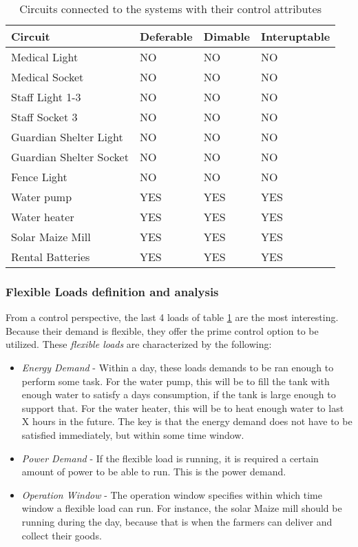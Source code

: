 \begin{table}[]
    \centering
    \small
    \begin{tabular}{|>{\raggedright\arraybackslash}p{4cm}|p{1.5cm}|p{1.5cm}|p{2cm}|}
         Circuit & Deferable & Dimable & Interuptable \\
         \hline
         Medical Light & NO & NO & NO\\
         Medical Socket & NO & NO & NO\\
         Staff Light 1-3 & NO & NO & NO\\
         Staff Socket 3 & NO & NO & NO\\
         Guardian Shelter Light & NO & NO & NO\\
         Guardian Shelter Socket & NO & NO & NO\\
         Fence Light & NO & NO & NO\\
         \hline
         Water pump & YES & YES & YES\\
         Water heater & YES & YES & YES\\
         \hline
         Solar Maize Mill & YES & YES & YES\\
         Rental Batteries & YES & YES & YES\\
         \hline
    \end{tabular}
    \caption[Circuits control attributes]{Circuits connected to the systems with their control attributes}
    \label{tab:circuit_control}
\end{table}

\subsubsection{Flexible Loads definition and analysis}\label{seq:flex_loads}
From a control perspective, the last 4 loads of table \ref{tab:circuit_control} are the most interesting. Because their demand is flexible, they offer the prime control option to be utilized. These \textit{flexible loads} are characterized by the following:
\begin{itemize}
    \item \textit{Energy Demand}    -   Within a day, these loads demands to be ran enough to perform some task. For the water pump, this will be to fill the tank with enough water to satisfy a days consumption, if the tank is large enough to support that. For the water heater, this will be to heat enough water to last X hours in the future. The key is that the energy demand does not have to be satisfied immediately, but within some time window.
    \item \textit{Power Demand}     -   If the flexible load is running, it is required a certain amount of power to be able to run. This is the power demand. 
    \item \textit{Operation Window} -   The operation window specifies within which time window a flexible load can run. For instance, the solar Maize mill should be running during the day, because that is when the farmers can deliver and collect their goods.   
\end{itemize}

